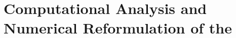 
\chapter{Computational Analysis and Numerical Reformulation of the }\label{ch:improveddra}
\startcontents[chapters]

\bigskip



